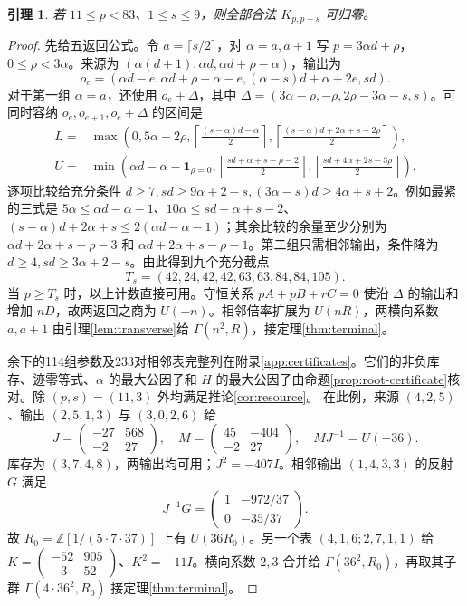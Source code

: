 \documentclass[11pt,a4paper]{article}
\newcommand{\Z}{\mathbb Z}
\newtheorem{lemma}[theorem]{引理}
\theoremstyle{definition}
\numberwithin{equation}{section}
\begin{document}
\begin{lemma}\label{lem:small-supply}
若 $11\le p<83$、$1\le s\le9$，则全部合法 $K_{p,p+s}$ 可归零。
\end{lemma}
\begin{proof}
先给五返回公式。令 $a=\lceil s/2\rceil$，对 $\alpha=a,a+1$ 写 $p=3\alpha d+\rho$，$0\le\rho<3\alpha$。来源为 $(\alpha(d+1),\alpha d,\alpha d+\rho-\alpha)$，输出为
\[
o_e=(\alpha d-e,\alpha d+\rho-\alpha-e,(\alpha-s)d+\alpha+2e,sd).
\]
对于第一组 $\alpha=a$，还使用 $o_e+\Delta$，其中 $\Delta=(3\alpha-\rho,-\rho,2\rho-3\alpha-s,s)$。可同时容纳 $o_e,o_{e+1},o_e+\Delta$ 的区间是
\begin{align*}
L={}&\max\left(0,5\alpha-2\rho,
\left\lceil\frac{(s-\alpha)d-\alpha}{2}\right\rceil,
\left\lceil\frac{(s-\alpha)d+2\alpha+s-2\rho}{2}\right\rceil\right),\\
U={}&\min\left(\alpha d-\alpha-\mathbf1_{\rho=0},
\left\lfloor\frac{sd+\alpha+s-\rho-2}{2}\right\rfloor,
\left\lfloor\frac{sd+4\alpha+2s-3\rho}{2}\right\rfloor\right).
\end{align*}
逐项比较给充分条件 $d\ge7,sd\ge9\alpha+2-s,(3\alpha-s)d\ge4\alpha+s+2$。例如最紧的三式是 $5\alpha\le\alpha d-\alpha-1$、$10\alpha\le sd+\alpha+s-2$、$(s-\alpha)d+2\alpha+s\le2(\alpha d-\alpha-1)$；其余比较的余量至少分别为 $\alpha d+2\alpha+s-\rho-3$ 和 $\alpha d+2\alpha+s-\rho-1$。第二组只需相邻输出，条件降为 $d\ge4,sd\ge3\alpha+2-s$。由此得到九个充分截点
\[
T_s=(42,24,42,42,63,63,84,84,105).
\]
当 $p\ge T_s$ 时，以上计数直接可用。守恒关系 $pA+pB+rC=0$ 使沿 $\Delta$ 的输出和增加 $nD$，故两返回之商为 $U(-n)$。相邻倍率扩展为 $U(nR)$，两横向系数 $a,a+1$ 由引理\ref{lem:transverse}给 $\Gamma(n^2,R)$，接定理\ref{thm:terminal}。

余下的114组参数及233对相邻表完整列在附录\ref{app:certificates}。它们的非负库存、迹零等式、$\alpha$ 的最大公因子和 $H$ 的最大公因子由命题\ref{prop:root-certificate}核对。除 $(p,s)=(11,3)$ 外均满足推论\ref{cor:resource}。
在此例，来源 $(4,2,5)$、输出 $(2,5,1,3)$ 与 $(3,0,2,6)$ 给
\[
J=\begin{pmatrix}-27&568\\-2&27\end{pmatrix},\quad
M=\begin{pmatrix}45&-404\\-2&27\end{pmatrix},\quad MJ^{-1}=U(-36).
\]
库存为 $(3,7,4,8)$，两输出均可用；$J^2=-407I$。相邻输出 $(1,4,3,3)$ 的反射 $G$ 满足
\[J^{-1}G=\begin{pmatrix}1&-972/37\\0&-35/37\end{pmatrix}.
\]
故 $R_0=\Z[1/(5\cdot7\cdot37)]$ 上有 $U(36R_0)$。另一个表 $(4,1,6;2,7,1,1)$ 给 $K=\left(\begin{smallmatrix}-52&905\\-3&52\end{smallmatrix}\right)$、$K^2=-11I$。横向系数 $2,3$ 合并给 $\Gamma(36^2,R_0)$，再取其子群 $\Gamma(4\cdot36^2,R_0)$ 接定理\ref{thm:terminal}。
\end{proof}
\end{document}
